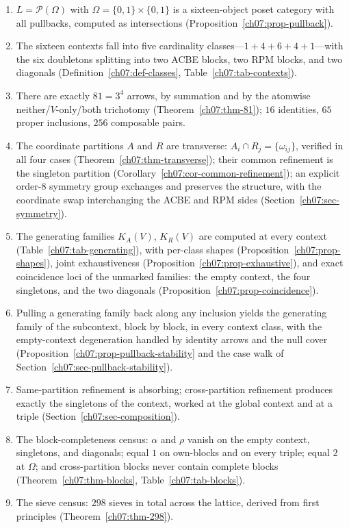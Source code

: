 \begin{enumerate}
\item $L=\mathcal{P}(\Omega)$ with $\Omega=\{0,1\}\times\{0,1\}$ is a sixteen-object poset category with all pullbacks, computed as intersections (Proposition~\ref{ch07:prop-pullback}).
\item The sixteen contexts fall into five cardinality classes---$1+4+6+4+1$---with the six doubletons splitting into two ACBE blocks, two RPM blocks, and two diagonals (Definition~\ref{ch07:def-classes}, Table~\ref{ch07:tab-contexts}).
\item There are exactly $81=3^{4}$ arrows, by summation and by the atomwise neither/$V$-only/both trichotomy (Theorem~\ref{ch07:thm-81}); $16$ identities, $65$ proper inclusions, $256$ composable pairs.
\item The coordinate partitions $A$ and $R$ are transverse: $A_{i}\cap R_{j}=\{\omega_{ij}\}$, verified in all four cases (Theorem~\ref{ch07:thm-transverse}); their common refinement is the singleton partition (Corollary~\ref{ch07:cor-common-refinement}); an explicit order-$8$ symmetry group exchanges and preserves the structure, with the coordinate swap interchanging the ACBE and RPM sides (Section~\ref{ch07:sec-symmetry}).
\item The generating families $K_{A}(V)$, $K_{R}(V)$ are computed at every context (Table~\ref{ch07:tab-generating}), with per-class shapes (Proposition~\ref{ch07:prop-shapes}), joint exhaustiveness (Proposition~\ref{ch07:prop-exhaustive}), and exact coincidence loci of the unmarked families: the empty context, the four singletons, and the two diagonals (Proposition~\ref{ch07:prop-coincidence}).
\item Pulling a generating family back along any inclusion yields the generating family of the subcontext, block by block, in every context class, with the empty-context degeneration handled by identity arrows and the null cover (Proposition~\ref{ch07:prop-pullback-stability} and the case walk of Section~\ref{ch07:sec-pullback-stability}).
\item Same-partition refinement is absorbing; cross-partition refinement produces exactly the singletons of the context, worked at the global context and at a triple (Section~\ref{ch07:sec-composition}).
\item The block-completeness census: $\alpha$ and $\rho$ vanish on the empty context, singletons, and diagonals; equal $1$ on own-blocks and on every triple; equal $2$ at $\Omega$; and cross-partition blocks never contain complete blocks (Theorem~\ref{ch07:thm-blocks}, Table~\ref{ch07:tab-blocks}).
\item The sieve census: $298$ sieves in total across the lattice, derived from first principles (Theorem~\ref{ch07:thm-298}).
\end{enumerate}

